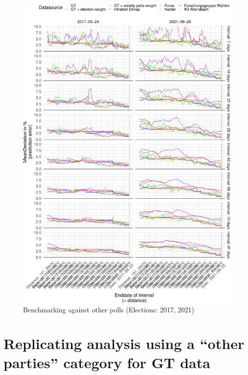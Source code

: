 \documentclass[
  letterpaper,
  DIV=11,
  numbers=noendperiod]{scrartcl}
\begin{document}
\begin{figure}[H]

\caption{\label{fig-A11}Benchmarking against other polls (Elections:
2017, 2021)}

{\centering \includegraphics{figures/fig-A11-1.pdf}

}

\end{figure}

\hypertarget{sec-other-parties}{%
\section{Replicating analysis using a ``other parties'' category for GT
data}\label{sec-other-parties}}
\end{document}

